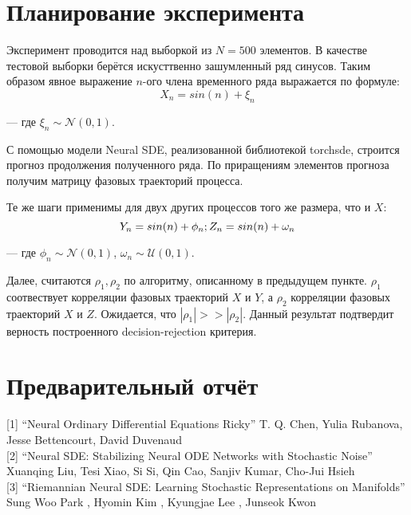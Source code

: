 \documentclass{article}
\begin{document}
\section{Планирование эксперимента}

   \par Эксперимент проводится над выборкой из $N=500$ элементов. В качестве тестовой выборки берётся искусттвенно зашумленный ряд синусов. Таким образом явное выражение $n$-ого члена временного ряда выражается по формуле:
   \begin{equation}
       X_n = sin(n) + \xi_n 
   \end{equation}
   \par --- где $\xi_n \sim \mathcal{N}(0,1)$.
   \par С помощью модели Neural SDE, реализованной библиотекой torchsde, строится прогноз продолжения полученного ряда. По приращениям элементов прогноза получим матрицу фазовых траекторий процесса.
   \par Те же шаги применимы для двух других процессов того же размера, что и $X$:
   \begin{equation}
       Y_n = sin(n) + \phi_n; \space Z_n = sin(n) + \omega_n
   \end{equation}
   \par --- где $\phi_n \sim \mathcal{N}(0,1)$, $\omega_n \sim \mathcal{U}(0,1)$.
   \par Далее, считаются $\rho_1,\rho_2$ по алгоритму, описанному в предыдущем пункте. $\rho_1$ соотвествует корреляции фазовых траекторий $X$ и $Y$, а $\rho_2$ корреляции фазовых траекторий $X$ и $Z$. Ожидается, что $|\rho_1| >> |\rho_2|$. Данный результат подтвердит верность построенного decision-rejection критерия. 

\section{Предварительный отчёт}
    




[1] “Neural Ordinary Differential Equations Ricky” T. Q. Chen, Yulia Rubanova, Jesse Bettencourt, David Duvenaud \\

[2] “Neural SDE: Stabilizing Neural ODE Networks with Stochastic Noise” Xuanqing Liu, Tesi Xiao, Si Si, Qin Cao, Sanjiv Kumar, Cho-Jui Hsieh  \\

[3] “Riemannian Neural SDE: Learning Stochastic Representations on Manifolds” Sung Woo Park , Hyomin Kim , Kyungjae Lee , Junseok Kwon \\
\end{document}
